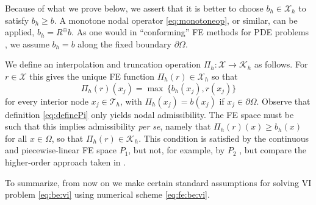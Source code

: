 \documentclass[hidelinks,onefignum,onetabnum,final]{siamart220329}  %
\newcommand{\cK}{\mathcal{K}}
\newcommand{\cT}{\mathcal{T}}
\newcommand{\cX}{\mathcal{X}}
\begin{document}
Because of what we prove below, we assert that it is better to choose $b_h \in \cX_h$ to satisfy $b_h\ge b$.  A monotone nodal operator \eqref{eq:monotoneop}, or similar, can be applied, $b_h = R^\oplus b$.  As one would in ``conforming'' FE methods for PDE problems \cite{Elmanetal2014}, we assume $b_h=b$ along the fixed boundary $\partial\Omega$.

We define an interpolation and truncation operation $\Pi_h : \cX \to \cK_h$ as follows.  For $r\in\cX$ this gives the unique FE function $\Pi_h(r) \in \cX_h$ so that
\begin{equation}
\Pi_h(r)(x_j) = \max \,\{b_h(x_j), r(x_j)\} \label{eq:definePi}
\end{equation}
for every interior node $x_j \in \cT_h$, with $\Pi_h(x_j)=b(x_j)$ if $x_j\in\partial\Omega$.  Observe that definition \eqref{eq:definePi} only yields nodal admissibility.  The FE space must be such that this implies admissibility \emph{per se}, namely that $\Pi_h(r)(x) \ge b_h(x)$ for all $x \in \Omega$, so that $\Pi_h(r) \in \cK_h$.  This condition is satisfied by the continuous and piecewise-linear FE space $P_1$, but not, for example, by $P_2$ \cite{BuelerFarrell2024}, but compare the higher-order approach taken in \cite{KeithSurowiec2023}.

To summarize, from now on we make certain standard assumptions for solving VI problem \eqref{eq:be:vi} using numerical scheme \eqref{eq:fe:be:vi}.
\end{document}
